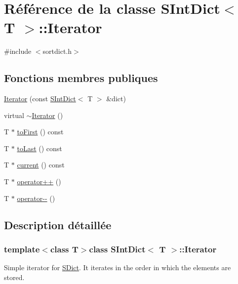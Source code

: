 \hypertarget{class_s_int_dict_1_1_iterator}{}\section{Référence de la classe S\+Int\+Dict$<$ T $>$\+:\+:Iterator}
\label{class_s_int_dict_1_1_iterator}


{\ttfamily \#include $<$sortdict.\+h$>$}

\subsection*{Fonctions membres publiques}
\begin{DoxyCompactItemize}
\item 
\hyperlink{class_s_int_dict_1_1_iterator_ae83e1143c2b3533c2becdd4c4ad5838b}{Iterator} (const \hyperlink{class_s_int_dict}{S\+Int\+Dict}$<$ T $>$ \&dict)
\item 
virtual \hyperlink{class_s_int_dict_1_1_iterator_a1cbe8bd97e0ad5064bbc14ce273931ee}{$\sim$\+Iterator} ()
\item 
T $\ast$ \hyperlink{class_s_int_dict_1_1_iterator_a1b3f9194baaf359e60ea6f407dce2d2b}{to\+First} () const 
\item 
T $\ast$ \hyperlink{class_s_int_dict_1_1_iterator_ac548bb334b550ecbcaa0664819830b09}{to\+Last} () const 
\item 
T $\ast$ \hyperlink{class_s_int_dict_1_1_iterator_a001a2e9877a7328f7dab001cdf2147a1}{current} () const 
\item 
T $\ast$ \hyperlink{class_s_int_dict_1_1_iterator_adefe5ae758222ef7519636012292fd40}{operator++} ()
\item 
T $\ast$ \hyperlink{class_s_int_dict_1_1_iterator_a9c0a5a230cfd2418781e9e837534c651}{operator-\/-\/} ()
\end{DoxyCompactItemize}


\subsection{Description détaillée}
\subsubsection*{template$<$class T$>$class S\+Int\+Dict$<$ T $>$\+::\+Iterator}

Simple iterator for \hyperlink{class_s_dict}{S\+Dict}. It iterates in the order in which the elements are stored. 

